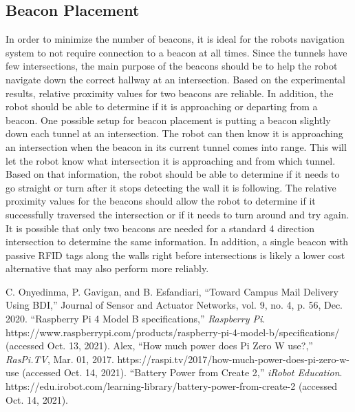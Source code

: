 \documentclass[12pt]{report}
\begin{document}
\subsection{Beacon Placement}
In order to minimize the number of beacons, it is ideal for the robots navigation system to not require connection to a beacon at all times. Since the tunnels have few intersections, the main purpose of the beacons should be to help the robot navigate down the correct hallway at an intersection. Based on the experimental results, relative proximity values for two beacons are reliable. In addition, the robot should be able to determine if it is approaching or departing from a beacon. One possible setup for beacon placement is putting a beacon slightly down each tunnel at an intersection. The robot can then know it is approaching an intersection when the beacon in its current tunnel comes into range. This will let the robot know what intersection it is approaching and from which tunnel. Based on that information, the robot should be able to determine if it needs to go straight or turn after it stops detecting the wall it is following. The relative proximity values for the beacons should allow the robot to determine if it successfully traversed the intersection or if it needs to turn around and try again. It is possible that only two beacons are needed for a standard 4 direction intersection to determine the same information. In addition, a single beacon with passive RFID tags along the walls right before intersections is likely a lower cost alternative that may also perform more reliably.


\renewcommand{\bibname}{References}
\begin{thebibliography}{AAA}
 C. Onyedinma, P. Gavigan, and B. Esfandiari, “Toward Campus Mail Delivery Using BDI,” Journal of Sensor and Actuator Networks, vol. 9, no. 4, p. 56, Dec. 2020.
 “Raspberry Pi 4 Model B specifications,” {\em Raspberry Pi}. https://www.raspberrypi.com/products/raspberry-pi-4-model-b/specifications/ (accessed Oct. 13, 2021).
 Alex, “How much power does Pi Zero W use?,” {\em RasPi.TV}, Mar. 01, 2017. https://raspi.tv/2017/how-much-power-does-pi-zero-w-use (accessed Oct. 14, 2021).
 “Battery Power from Create 2,” {\em iRobot Education}. https://edu.irobot.com/learning-library/battery-power-from-create-2 (accessed Oct. 14, 2021).
\end{thebibliography}
%    
%    
    \addcontentsline{toc}{chapter}{\bibname}
    

\appendix
\end{document}
